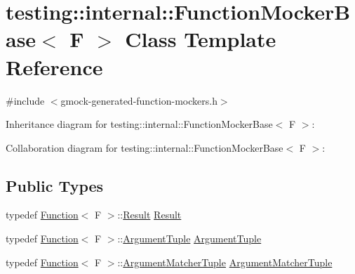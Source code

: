 \hypertarget{classtesting_1_1internal_1_1_function_mocker_base}{}\section{testing\+:\+:internal\+:\+:Function\+Mocker\+Base$<$ F $>$ Class Template Reference}
\label{classtesting_1_1internal_1_1_function_mocker_base}


{\ttfamily \#include $<$gmock-\/generated-\/function-\/mockers.\+h$>$}



Inheritance diagram for testing\+:\+:internal\+:\+:Function\+Mocker\+Base$<$ F $>$\+:


Collaboration diagram for testing\+:\+:internal\+:\+:Function\+Mocker\+Base$<$ F $>$\+:
\subsection*{Public Types}
\begin{DoxyCompactItemize}
\item 
typedef \hyperlink{structtesting_1_1internal_1_1_function}{Function}$<$ F $>$\+::\hyperlink{classtesting_1_1internal_1_1_function_mocker_base_aa50abc4055b4d3a14ad64c317bccec8d}{Result} \hyperlink{classtesting_1_1internal_1_1_function_mocker_base_aa50abc4055b4d3a14ad64c317bccec8d}{Result}
\item 
typedef \hyperlink{structtesting_1_1internal_1_1_function}{Function}$<$ F $>$\+::\hyperlink{classtesting_1_1internal_1_1_function_mocker_base_a336432a07e544af4ffb8103603471ca3}{Argument\+Tuple} \hyperlink{classtesting_1_1internal_1_1_function_mocker_base_a336432a07e544af4ffb8103603471ca3}{Argument\+Tuple}
\item 
typedef \hyperlink{structtesting_1_1internal_1_1_function}{Function}$<$ F $>$\+::\hyperlink{classtesting_1_1internal_1_1_function_mocker_base_ab790bcb1dcf57fa6659365386723ae5a}{Argument\+Matcher\+Tuple} \hyperlink{classtesting_1_1internal_1_1_function_mocker_base_ab790bcb1dcf57fa6659365386723ae5a}{Argument\+Matcher\+Tuple}
\end{DoxyCompactItemize}
